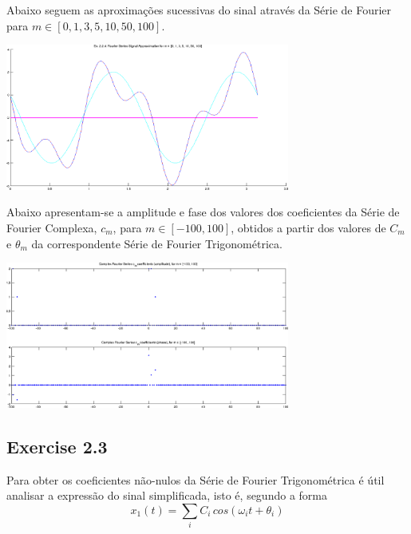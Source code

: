 \documentclass[a4paper]{article}
\begin{document}
\noindent Abaixo seguem as aproximações sucessivas do sinal através da Série de Fourier para $m \in [0, 1, 3, 5, 10, 50, 100]$.
\begin{center}
	\includegraphics[width=0.70\textwidth]{images/ex2_2_4_approx.png}
	\label{fig:ex2_2_4_approx}
\end{center}

\noindent Abaixo apresentam-se a amplitude e fase dos valores dos coeficientes da Série de Fourier Complexa, $c_m$, para $m \in [-100, 100]$, obtidos a partir dos valores de $C_m$ e $\theta_m$ da correspondente Série de Fourier Trigonométrica.
\begin{center}
	\includegraphics[width=0.70\textwidth]{images/ex2_2_4_complex_cm.png}
	\label{fig:ex2_2_4_complex_cm}
\end{center}

\subsection{Exercise 2.3}
\label{subsec:ex_2_3}
\noindent Para obter os coeficientes não-nulos da Série de Fourier Trigonométrica é útil analisar a expressão do sinal simplificada, isto é, segundo a forma
\begin{equation}
x_{1}(t) = \sum_{i} C_{i} \, cos(\omega_{i} t + \theta_{i})
\end{equation}
\end{document}
